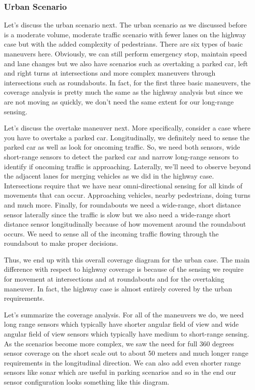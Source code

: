 \subsubsection{Urban Scenario}
\label{urban_scenario}

Let's discuss the urban scenario next. 
The urban scenario as we discussed before is a moderate volume, moderate traffic scenario with fewer lanes on the highway case but with the added complexity of pedestrians. 
There are six types of basic maneuvers here. Obviously, we can still perform emergency stop, maintain speed and lane changes but we also have scenarios such as overtaking a parked car, 
left and right turns at intersections and more complex maneuvers through intersections such as roundabouts. 
In fact, for the first three basic maneuvers, the coverage analysis is pretty much the same as the highway analysis but since we are not moving as quickly, 
we don't need the same extent for our long-range sensing. 

Let's discuss the overtake maneuver next. 
More specifically, consider a case where you have to overtake a parked car. 
Longitudinally, we definitely need to sense the parked car as well as look for oncoming traffic. 
So, we need both sensors, wide short-range sensors to detect the parked car and narrow long-range sensors to identify if oncoming traffic is approaching. 
Laterally, we'll need to observe beyond the adjacent lanes for merging vehicles as we did in the highway case. 
Intersections require that  we  have near omni-directional sensing for all kinds of movements that can occur. 
Approaching vehicles, nearby pedestrians, doing turns and much more. 
Finally, for roundabouts we need a wide-range, short distance sensor laterally since the traffic is slow but 
we also need a wide-range short distance sensor longitudinally because of how movement around the roundabout occurs. 
We need to sense all of the incoming traffic flowing through the roundabout to make proper decisions. 

Thus, we end up with this overall coverage diagram for the urban case. 
The main difference with respect to highway coverage is because of the sensing we require 
for movement at intersections and at roundabouts and for the overtaking maneuver. 
In fact, the highway case is almost entirely covered by the urban requirements. 


Let's summarize the coverage analysis. For all of the maneuvers we do, we need long range sensors which typically 
have shorter angular field of view and wide angular field of view sensors which typically have medium to short-range sensing. 
As the scenarios become more complex, we saw the need for full 360 degrees sensor coverage on the short scale out to 
about 50 meters and much longer range requirements in the longitudinal direction. 
We can also add even shorter range sensors like sonar which are useful in parking scenarios and so in the end our sensor configuration looks something like this diagram. 

